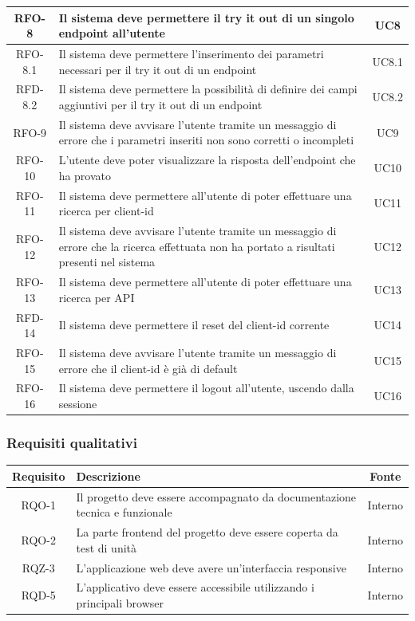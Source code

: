 \begin{center}
\begin{longtable}{|c|p{}|c|}
\hline
RFO-8 &Il sistema deve permettere il try it out di un singolo endpoint all'utente & UC8 \\
\hline
RFO-8.1 &Il sistema deve permettere l'inserimento dei parametri necessari per il try it out di un endpoint & UC8.1 \\
\hline
RFD-8.2 &Il sistema deve permettere la possibilità di definire dei campi aggiuntivi per il try it out di un endpoint & UC8.2 \\
\hline
RFO-9 &Il sistema deve avvisare l'utente tramite un messaggio di errore che i parametri inseriti non sono corretti o incompleti & UC9 \\
\hline
RFO-10 &L'utente deve poter visualizzare la risposta dell'endpoint che ha provato & UC10 \\
\hline
RFO-11 &Il sistema deve permettere all'utente di poter effettuare una ricerca per client-id & UC11 \\
\hline
RFO-12 &Il sistema deve avvisare l'utente tramite un messaggio di errore che la ricerca effettuata non ha portato a risultati presenti nel sistema & UC12 \\
\hline
RFO-13 &Il sistema deve permettere all'utente di poter effettuare una ricerca per API & UC13 \\
\hline
RFD-14 &Il sistema deve permettere il reset del client-id corrente & UC14 \\
\hline
RFO-15 &Il sistema deve avvisare l'utente tramite un messaggio di errore che il client-id è già di default & UC15 \\
\hline
RFO-16 &Il sistema deve permettere il logout all'utente, uscendo dalla sessione  & UC16 \\
\hline
\end{longtable}
\end{center}

\subsubsection{Requisiti qualitativi}


\begin{center}
\label{tab:requisiti-qualitativi}
\begin{longtable}{|c|p{}|c|}
\hline
\textbf{Requisito} & \textbf{Descrizione} & \textbf{Fonte}\\
\hline
RQO-1 &Il progetto deve essere accompagnato da documentazione tecnica e funzionale & Interno \\
\hline
RQO-2 &La parte frontend del progetto deve essere coperta da test di unità & Interno \\
\hline
RQZ-3 &L'applicazione web deve avere un'interfaccia responsive & Interno \\
\hline
RQD-5 &L'applicativo deve essere accessibile utilizzando i principali browser & Interno \\
\hline
\end{longtable}
\end{center}


